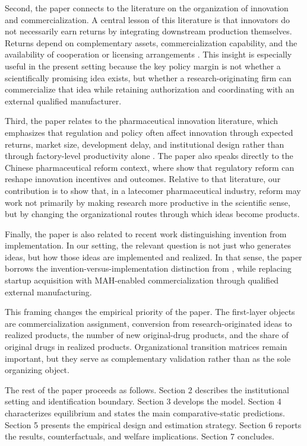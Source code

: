 \documentclass[12pt]{article}
\begin{document}
Second, the paper connects to the literature on the organization of innovation and commercialization. A central lesson of this literature is that innovators do not necessarily earn returns by integrating downstream production themselves. Returns depend on complementary assets, commercialization capability, and the availability of cooperation or licensing arrangements \citep{Teece1986, AroraFosfuriGambardella2001, AroraMerges2004, GansStern2003, GansHsuStern2002, AroraGambardella2010}. This insight is especially useful in the present setting because the key policy margin is not whether a scientifically promising idea exists, but whether a research-originating firm can commercialize that idea while retaining authorization and coordinating with an external qualified manufacturer.

Third, the paper relates to the pharmaceutical innovation literature, which emphasizes that regulation and policy often affect innovation through expected returns, market size, development delay, and institutional design rather than through factory-level productivity alone \citep{AcemogluLinn2004, Lakdawalla2018}. The paper also speaks directly to the Chinese pharmaceutical reform context, where \citet{JiaMaYangZhang2024} show that regulatory reform can reshape innovation incentives and outcomes. Relative to that literature, our contribution is to show that, in a latecomer pharmaceutical industry, reform may work not primarily by making research more productive in the scientific sense, but by changing the organizational routes through which ideas become products.

Finally, the paper is also related to recent work distinguishing invention from implementation. In our setting, the relevant question is not just who generates ideas, but how those ideas are implemented and realized. In that sense, the paper borrows the invention-versus-implementation distinction from \citet{FonsRosenRoldanBlancoSchmitz2024}, while replacing startup acquisition with MAH-enabled commercialization through qualified external manufacturing.

This framing changes the empirical priority of the paper. The first-layer objects are commercialization assignment, conversion from research-originated ideas to realized products, the number of new original-drug products, and the share of original drugs in realized products. Organizational transition matrices remain important, but they serve as complementary validation rather than as the sole organizing object.

The rest of the paper proceeds as follows. Section 2 describes the institutional setting and identification boundary. Section 3 develops the model. Section 4 characterizes equilibrium and states the main comparative-static predictions. Section 5 presents the empirical design and estimation strategy. Section 6 reports the results, counterfactuals, and welfare implications. Section 7 concludes.
\end{document}
